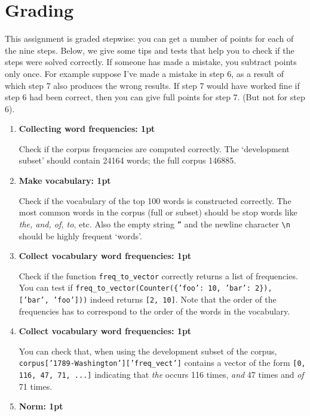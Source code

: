 \documentclass[11pt, a4paper]{article}
\begin{document}
\section{Grading}

This assignment is graded stepwise: you can get a number of points for each of the nine steps. 
Below, we give some tips and tests that help you to check if the steps were solved correctly.
If someone has made a mistake, you subtract points only once. 
For example suppose I've made a mistake in step 6, as a result of which step 7 also produces the wrong results. If step 7 would have worked fine if step 6 had been correct, then you can give full points for step 7. (But not for step 6).


\begin{enumerate}
  \item \textbf{Collecting word frequencies: 1pt} 

  Check if the corpus frequencies are computed correctly. The `development subset' should contain 24164 words; the full corpus 146885.


  \item \textbf{Make vocabulary: 1pt}

  Check if the vocabulary of the top 100 words is constructed correctly. The most common words in the corpus (full or subset) should be stop words like \emph{the, and, of, to}, etc. Also the empty string \texttt{''}  and the newline character \texttt{\textbackslash n} should be highly frequent `words'.
  
  \item \textbf{Collect vocabulary word frequencies: 1pt}

  Check if the function \texttt{freq\_to\_vector} correctly returns a list of frequencies. You can test if \texttt{freq\_to\_vector(Counter(\{'foo': 10, 'bar': 2\}), ['bar', 'foo']))} indeed returns \texttt{[2, 10]}. Note that the order of the frequencies has to correspond to the order of the words in the vocabulary.
  
  \item \textbf{Collect vocabulary word frequencies: 1pt}
  
  You can check that, when using the development subset of the corpus, \\\texttt{corpus['1789-Washington']['freq\_vect']} contains a vector of the form \texttt{[0, 116, 47, 71, ...]} indicating that \emph{the} occurs 116 times, \emph{and} 47 times and \emph{of} 71 times.
  
  \item \textbf{Norm: 1pt}


\end{enumerate}
\end{document}
